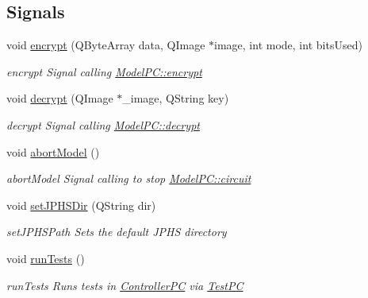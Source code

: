\subsection*{Signals}
\begin{DoxyCompactItemize}
\item 
void \hyperlink{class_view_p_c_a27ecfb84029d42029631b776a02ff5d8}{encrypt} (Q\-Byte\-Array data, Q\-Image $\ast$image, int mode, int bits\-Used)
\begin{DoxyCompactList}\small\item\em encrypt Signal calling \hyperlink{class_model_p_c_a48667f5b1a547d03a3def2d3db5a220f}{Model\-P\-C\-::encrypt} \end{DoxyCompactList}\item 
void \hyperlink{class_view_p_c_aef365fa37c40972e1c1504de647fee12}{decrypt} (Q\-Image $\ast$\-\_\-image, Q\-String key)
\begin{DoxyCompactList}\small\item\em decrypt Signal calling \hyperlink{class_model_p_c_a9458c3a1e369a64889d9a1f70e0c1d18}{Model\-P\-C\-::decrypt} \end{DoxyCompactList}\item 
void \hyperlink{class_view_p_c_aa652102ce6b5757b8eef830409c8cabf}{abort\-Model} ()
\begin{DoxyCompactList}\small\item\em abort\-Model Signal calling to stop \hyperlink{class_model_p_c_a1d0091062a0c836b283ec2f67411623b}{Model\-P\-C\-::circuit} \end{DoxyCompactList}\item 
void \hyperlink{class_view_p_c_ae81085836c0c01bc9556a5b27eb8d19c}{set\-J\-P\-H\-S\-Dir} (Q\-String dir)
\begin{DoxyCompactList}\small\item\em set\-J\-P\-H\-S\-Path Sets the default J\-P\-H\-S directory \end{DoxyCompactList}\item 
void \hyperlink{class_view_p_c_a96a6c95728bf20c64d2a8fe978495395}{run\-Tests} ()
\begin{DoxyCompactList}\small\item\em run\-Tests Runs tests in \hyperlink{class_controller_p_c}{Controller\-P\-C} via \hyperlink{class_test_p_c}{Test\-P\-C} \end{DoxyCompactList}\end{DoxyCompactItemize}
